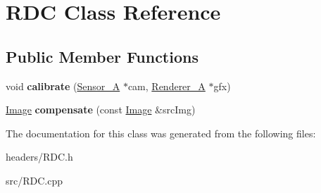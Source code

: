 \hypertarget{class_r_d_c}{\section{R\-D\-C Class Reference}
\label{class_r_d_c}
}
\subsection*{Public Member Functions}
\begin{DoxyCompactItemize}
\item 
\hypertarget{class_r_d_c_a70face7e6f7c3f65772614fca001a52e}{void {\bfseries calibrate} (\hyperlink{class_sensor___a}{Sensor\-\_\-\-A} $\ast$cam, \hyperlink{class_renderer___a}{Renderer\-\_\-\-A} $\ast$gfx)}\label{class_r_d_c_a70face7e6f7c3f65772614fca001a52e}

\item 
\hypertarget{class_r_d_c_afd4c8763d879d5c811ed1329d1ab12a2}{\hyperlink{class_image}{Image} {\bfseries compensate} (const \hyperlink{class_image}{Image} \&src\-Img)}\label{class_r_d_c_afd4c8763d879d5c811ed1329d1ab12a2}

\end{DoxyCompactItemize}


The documentation for this class was generated from the following files\-:\begin{DoxyCompactItemize}
\item 
headers/R\-D\-C.\-h\item 
src/R\-D\-C.\-cpp\end{DoxyCompactItemize}
